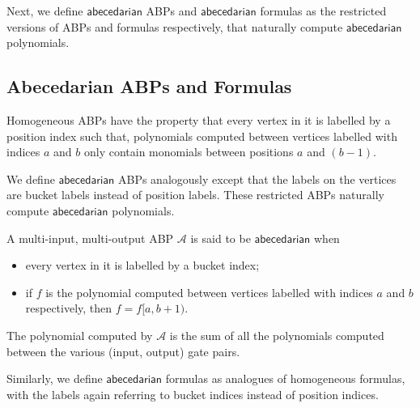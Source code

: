 \documentclass[10pt,a4paper]{article}
\newcommand{\abp}{\textbf{$\mathcal{A}$}}
\newcommand{\abcd}{\mathsf{abecedarian}}
\begin{document}
\hspace{.5em}

\noindent Next, we define $\abcd$ ABPs and $\abcd$ formulas as the restricted versions of ABPs and formulas respectively, that naturally compute $\abcd$ polynomials.

\subsection{Abecedarian ABPs and Formulas}\label{sec:defn_abcd_ABP_form}

Homogeneous ABPs have the property that every vertex in it is labelled by a position index such that, polynomials computed between vertices labelled with indices $a$ and $b$ only contain monomials between positions $a$ and $(b-1)$.

We define $\abcd$ ABPs analogously except that the labels on the vertices are bucket labels instead of position labels. 
These restricted ABPs naturally compute $\abcd$ polynomials.

\begin{definition}\label{def:ordABP}
	A multi-input, multi-output ABP $\abp$ is said to be $\abcd$ when
	\begin{itemize}
		\item every vertex in it is labelled by a bucket index;
		\item if $f$ is the polynomial computed between vertices labelled with indices $a$ and $b$ respectively, then $f = f[a,b+1)$. 
	\end{itemize}
	The polynomial computed by $\abp$ is the sum of all the polynomials computed between the various (input, output) gate pairs.
\end{definition}

Similarly, we define $\abcd$ formulas as analogues of homogeneous formulas, with the labels again referring to bucket indices instead of position indices.
\end{document}
